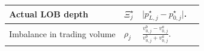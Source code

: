 \documentclass[10pt,a4paper,oneside]{article}
\begin{document}
\begin{longtable}{|p{4cm}|p{2.25cm}|p{5.25cm}|p{2.25cm}|}

    Actual LOB depth                                                                                                                                                       &
    $\Xi^{\star}_j$                                                                                                                                                        &
    $\big| p^{\star}_{L, j} - p^{\star}_{0, j} \big|$.                                                                                                                     &
    \cite{briola2024deep}                                                                                                                                                                                                                                                                                                                                                                      \\ \hline

    Imbalance in trading volume                                                                                                                                            &
    $\rho_j$                                                                                                                                                               &
    $\frac{v^b_{0, j} - v^a_{0, j}}{v^b_{0, j} + v^a_{0, j}}$.                                                                                                             &
    \cite{cartea2018enhancing}                                                                                                                                                                                                                                                                                                                                                                 \\ \hline


\end{longtable}
\end{document}
